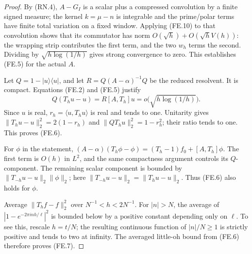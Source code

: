 \begin{proof}
By (RN.4), \(A-G_I\) is a scalar plus a compressed convolution
by a finite signed measure; the kernel \(k=\mu-n\) is integrable
and the prime/polar terms have finite total variation on a fixed
window.  Applying (FE.10) to that convolution shows that its
commutator has norm \(O(\sqrt h)+O(\sqrt h V(h))\): the wrapping
strip contributes the first term, and the two \(w_h\) terms the
second.  Dividing by \(\sqrt{h\log(1/h)}\) gives strong convergence
to zero.  This establishes (FE.5) for the actual \(A\).

Let \(Q=1-|u\rangle\langle u|\), and let
\(R=Q(A-\alpha)^{-1}Q\) be the reduced resolvent.
It is compact.  Equations (FE.2) and (FE.5) justify
\[
 Q(T_hu-u)=R[A,T_h]u
                  =o\bigl(\sqrt{h\log(1/h)}\bigr).        \tag{FE.14}
\]
Since \(u\) is real, \(r_h=\langle u,T_hu\rangle\) is real
and tends to one.  Unitarity gives
\(\|T_hu-u\|_2^2=2(1-r_h)\) and
\(\|QT_hu\|_2^2=1-r_h^2\); their ratio tends to one.
This proves (FE.6).

For \(\phi\) in the statement,
\((A-\alpha)(T_h\phi-\phi)=(T_h-1)f_0+[A,T_h]\phi\).
The first term is \(O(h)\) in \(L^2\), and the same compactness
argument controls its \(Q\)-component.
The remaining scalar component is bounded by
\(\|T_{-h}u-u\|_2\|\phi\|_2\); here
\(\|T_{-h}u-u\|_2=\|T_hu-u\|_2\).
Thus (FE.6) also holds for \(\phi\).

Average \(\|T_hf-f\|_2^2\) over \(N^{-1}<h<2N^{-1}\).
For \(|n|>N\), the average of
\(|1-e^{-2\pi inh/\ell}|^2\) is bounded below by a positive
constant depending only on \(\ell\).
To see this, rescale \(h=t/N\); the resulting continuous
function of \(|n|/N\geq1\) is strictly positive and tends to two
at infinity.  The averaged little-oh bound from (FE.6)
therefore proves (FE.7).
\end{proof}

